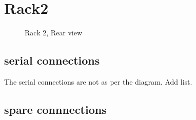 \documentclass[a4paper]{article}
\begin{document}
















\newpage

\section{Rack2}

\begin{figure}[h!]
\begin{center}
\caption{Rack 2, Rear view}
\label{fig:Rack2}
\end{center}
\end{figure}

\newpage
\subsection{serial connections}
The serial connections are not as per the diagram. Add list.
\subsection{spare connnections\label{ref:rack2spare}}
\end{document}
